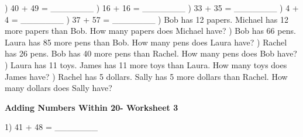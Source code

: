 \documentclass{article}%
\begin{document}
\newline%
) 40 + 49 = \_\_\_\_\_\_\_%
\newline%
\newline%
) 16 + 16 = \_\_\_\_\_\_\_%
\newline%
\newline%
) 33 + 35 = \_\_\_\_\_\_\_%
\newline%
\newline%
) 4 + 4 = \_\_\_\_\_\_\_%
\newline%
\newline%
) 37 + 57 = \_\_\_\_\_\_\_%
\newline%
\newline%
) Bob has 12 papers. Michael has 12 more papers than Bob. How many papers does Michael have?%
\newline%
\newline%
) Bob has 66 pens. Laura has 85 more pens than Bob. How many pens does Laura have?%
\newline%
\newline%
) Rachel has 26 pens. Bob has 40 more pens than Rachel. How many pens does Bob have?%
\newline%
\newline%
) Laura has 11 toys. James has 11 more toys than Laura. How many toys does James have?%
\newline%
\newline%
) Rachel has 5 dollars. Sally has 5 more dollars than Rachel. How many dollars does Sally have?%
\newline%
\newline%
\newline%
\pagebreak%
\large%
\begin{center}%
\textbf{Adding Numbers Within 20- Worksheet 3}%
\newline%
\newline%
\newline%
\end{center} \normalsize%
1) 41 + 48 = \_\_\_\_\_\_\_%
\newline%
\end{document}
